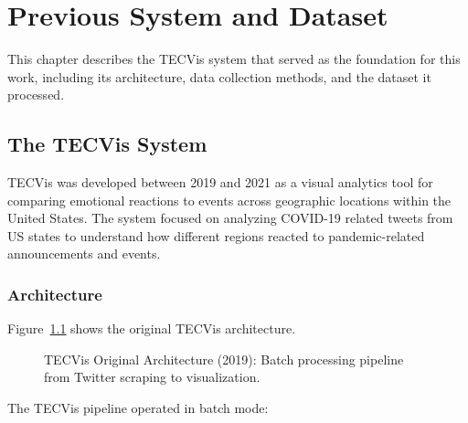 
\chapter{Previous System and Dataset}
\label{Chapter3}


This chapter describes the TECVis system that served as the foundation for this work, including its architecture, data collection methods, and the dataset it processed.


\section{The TECVis System}

TECVis \cite{tecvis2023} was developed between 2019 and 2021 as a visual analytics tool for comparing emotional reactions to events across geographic locations within the United States. The system focused on analyzing COVID-19 related tweets from US states to understand how different regions reacted to pandemic-related announcements and events.

\subsection{Architecture}

Figure~\ref{fig:tecvis_old} shows the original TECVis architecture.

\begin{figure}[htbp]
\centering

\caption{TECVis Original Architecture (2019): Batch processing pipeline from Twitter scraping to visualization.}
\label{fig:tecvis_old}
\end{figure}

The TECVis pipeline operated in batch mode:

